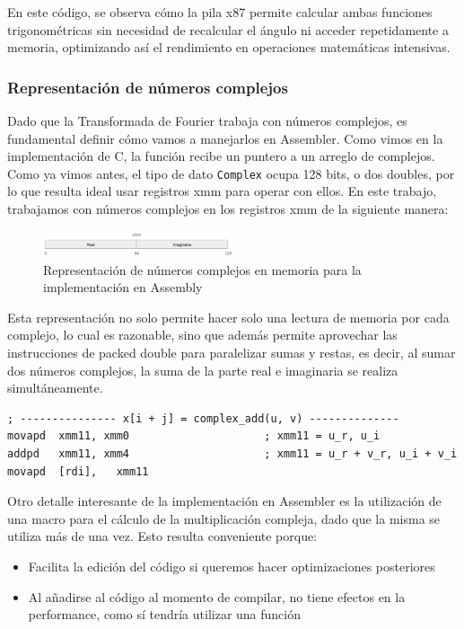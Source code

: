 \documentclass[a4paper]{article}
\begin{document}
En este código, se observa cómo la pila x87 permite calcular ambas funciones trigonométricas sin necesidad de recalcular el ángulo ni acceder repetidamente a memoria, optimizando así el rendimiento en operaciones matemáticas intensivas.


\subsubsection{Representación de números complejos}
Dado que la Transformada de Fourier trabaja con números complejos, es fundamental definir cómo vamos a manejarlos en Assembler. Como vimos en la implementación de C, la función recibe un puntero a un arreglo de complejos. Como ya vimos antes, el tipo de dato \texttt{Complex} ocupa 128 bits, o dos doubles, por lo que resulta ideal usar registros xmm para operar con ellos. En este trabajo, trabajamos con números complejos en los registros xmm de la siguiente manera:

\begin{figure}[h]
    \centering
    \includegraphics[width=0.5\textwidth]{extra/xmm complex.png}
    \caption{Representación de números complejos en memoria para la implementación en Assembly}
    \label{fig:asm_complex_representation}
\end{figure}
Esta representación no solo permite hacer solo una lectura de memoria por cada complejo, lo cual es razonable, sino que además permite aprovechar las instrucciones de packed double para paralelizar sumas y restas, es decir, al sumar dos números complejos, la suma de la parte real e imaginaria se realiza simultáneamente.

\begin{verbatim}
; --------------- x[i + j] = complex_add(u, v) --------------
movapd  xmm11, xmm0                     ; xmm11 = u_r, u_i
addpd   xmm11, xmm4                     ; xmm11 = u_r + v_r, u_i + v_i
movapd  [rdi],   xmm11
\end{verbatim}

Otro detalle interesante de la implementación en Assembler es la utilización de una macro para el cálculo de la multiplicación compleja, dado que la misma se utiliza más de una vez. Esto resulta conveniente porque:

\begin{itemize}
    \item Facilita la edición del código si queremos hacer optimizaciones posteriores
    \item Al añadirse al código al momento de compilar, no tiene efectos en la performance, como sí tendría utilizar una función
\end{itemize}
\end{document}
